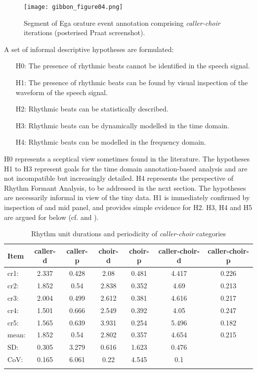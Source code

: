 \documentclass[output=paper,colorlinks,citecolor=brown]{langscibook}
\begin{document}
\begin{figure}
\texttt{[image: gibbon\_figure04.png]}
\caption{\label{fig:fig04}Segment of Ega orature event annotation comprising \textit{caller-choir} iterations (posterised Praat screenshot).}
\end{figure}

A set of informal descriptive hypotheses are formulated:

\begin{itemize}
    \item[H0:] The presence of rhythmic beats cannot be identified in the speech signal.
    \item[H1:] The presence of rhythmic beats can be found by visual inspection of the waveform of the speech signal.
    \item[H2:] Rhythmic beats can be statistically described.
    \item[H3:] Rhythmic beats can be dynamically modelled in the time domain.
    \item[H4:] Rhythmic beats can be modelled in the frequency domain.
\end{itemize}

H0 represents a sceptical view sometimes found in the literature. The hypotheses H1 to H3 represent goals for the time domain annotation-based analysis and are not incompatible but increasingly detailed. H4 represents the perspective of Rhythm Formant Analysis, to be addressed in the next section. The hypotheses are necessarily informal in view of the tiny data. H1 is immediately confirmed by inspection of  and  mid panel, and  provides simple evidence for H2. H3, H4 and H5 are argued for below (cf.  and ).

\begin{table}
\small
\caption{Rhythm unit durations and periodicity of \textit{caller-choir} categories}
\label{table:table01}
\begin{tabular}{l *6{S[table-format=1.3]}}
\lsptoprule
Item	& {caller-d} & {caller-p} & {choir-d} & {choir-p} & {caller-choir-d} & {caller-choir-p}\\\midrule
cr1:	& 2.337	& 0.428	& 2.08	& 0.481	& 4.417	& 0.226\\
cr2:	& 1.852	& 0.54	& 2.838	& 0.352	& 4.69	& 0.213\\
cr3:	& 2.004	& 0.499	& 2.612	& 0.381	& 4.616	& 0.217\\
cr4:	& 1.501	& 0.666	& 2.549	& 0.392	& 4.05	& 0.247\\
cr5:	& 1.565	& 0.639	& 3.931	& 0.254	& 5.496	& 0.182\\\addlinespace
mean:	& 1.852	& 0.54	& 2.802	& 0.357	& 4.654	& 0.215\\
SD:	    & 0.305	& 3.279	& 0.616	& 1.623	& 0.476	& \\
CoV:	& 0.165	& 6.061	& 0.22	& 4.545	& 0.1	& \\
\lsptoprule
\end{tabular}
\end{table}
\end{document}
